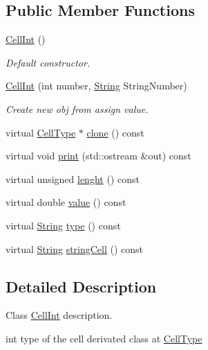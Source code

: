 \subsection*{Public Member Functions}
\begin{DoxyCompactItemize}
\item 
\mbox{\label{class_cell_int_a78dcfbea831221d91cb59dc730c33fe3}} 
\hyperlink{class_cell_int_a78dcfbea831221d91cb59dc730c33fe3}{Cell\+Int} ()
\begin{DoxyCompactList}\small\item\em Default constructor. \end{DoxyCompactList}\item 
\mbox{\label{class_cell_int_a103804b6b564d7fea54e84b369e0baff}} 
\hyperlink{class_cell_int_a103804b6b564d7fea54e84b369e0baff}{Cell\+Int} (int number, \hyperlink{class_string}{String} String\+Number)
\begin{DoxyCompactList}\small\item\em Create new obj from assign value. \end{DoxyCompactList}\item 
virtual \hyperlink{class_cell_type}{Cell\+Type} $\ast$ \hyperlink{class_cell_int_a767b15d99c5ec0e2594dc35300e51873}{clone} () const
\item 
virtual void \hyperlink{class_cell_int_a1cb8461721999308790d105adff41cd2}{print} (std\+::ostream \&out) const
\item 
virtual unsigned \hyperlink{class_cell_int_afcab8270ff1853a08460051e02e62ace}{lenght} () const
\item 
virtual double \hyperlink{class_cell_int_a1be32d235fbcc58483948770fb7ce9c6}{value} () const
\item 
virtual \hyperlink{class_string}{String} \hyperlink{class_cell_int_a65c7fa9731cc6f5b40579f314ba090dd}{type} () const
\item 
virtual \hyperlink{class_string}{String} \hyperlink{class_cell_int_ae6b32857bc96f305fff4226c988032d4}{string\+Cell} () const
\end{DoxyCompactItemize}


\subsection{Detailed Description}
Class \hyperlink{class_cell_int}{Cell\+Int} description. 

int type of the cell derivated class at \hyperlink{class_cell_type}{Cell\+Type} 

